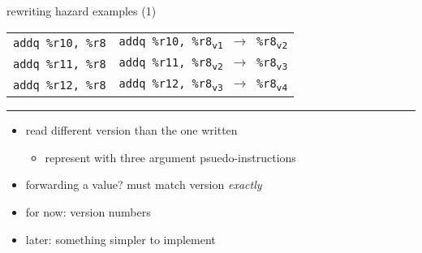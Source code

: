 \begin{frame}[fragile,label=rawRewriting1]{rewriting hazard examples (1)}
\begin{tabular}{l|l}
\texttt{addq \%r10, \%r8} &
\texttt{addq \%r10, \%r8\textsubscript{v1} $\rightarrow$ \%r8\textsubscript{v2}} \\
\texttt{addq \%r11, \%r8} &
\texttt{addq \%r11, \%r8\textsubscript{v2} $\rightarrow$ \%r8\textsubscript{v3}} \\
\texttt{addq \%r12, \%r8} &
\texttt{addq \%r12, \%r8\textsubscript{v3} $\rightarrow$ \%r8\textsubscript{v4}} \\
\end{tabular}
\hrule
\begin{itemize}
\item read different version than the one written
    \begin{itemize}
    \item represent with three argument psuedo-instructions
    \end{itemize}
\item forwarding a value? must match version \textit{exactly}
\vspace{.5cm}
\item for now: version numbers
\item later: something simpler to implement
\end{itemize}
\end{frame}


